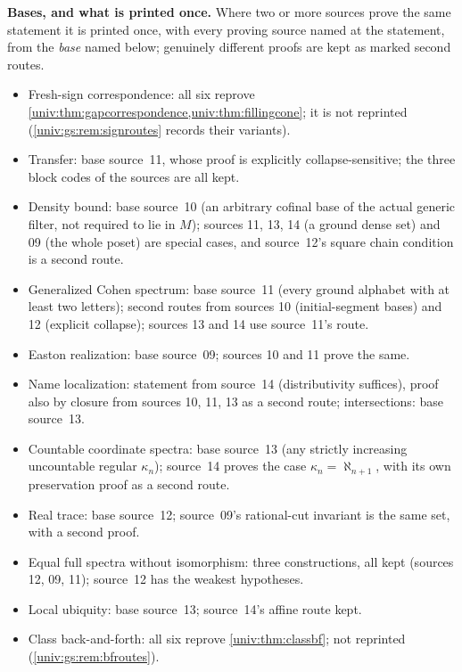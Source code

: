 \documentclass[11pt,letterpaper]{article}
\numberwithin{equation}{section}
\theoremstyle{definition}
\theoremstyle{remark}
\begin{document}
\textbf{Bases, and what is printed once.} Where two or more sources prove the
same statement it is printed once, with every proving source named at the
statement, from the \emph{base} named below; genuinely different proofs are
kept as marked second routes.
\begin{itemize}
\item Fresh-sign correspondence: all six reprove
\cref{univ:thm:gapcorrespondence,univ:thm:fillingcone}; it is not reprinted
(\cref{univ:gs:rem:signroutes} records their variants).
\item Transfer: base source~11, whose proof is explicitly collapse-sensitive;
the three block codes of the sources are all kept.
\item Density bound: base source~10 (an arbitrary cofinal base of the actual
generic filter, not required to lie in $M$); sources 11, 13, 14 (a ground dense
set) and 09 (the whole poset) are special cases, and source~12's square chain
condition is a second route.
\item Generalized Cohen spectrum: base source~11 (every ground alphabet with at
least two letters); second routes from sources 10 (initial-segment bases) and
12 (explicit collapse); sources 13 and 14 use source~11's route.
\item Easton realization: base source~09; sources 10 and 11 prove the same.
\item Name localization: statement from source~14 (distributivity suffices),
proof also by closure from sources 10, 11, 13 as a second route;
intersections: base source~13.
\item Countable coordinate spectra: base source~13 (any strictly increasing
uncountable regular $\kappa_n$); source~14 proves the case
$\kappa_n=\aleph_{n+1}$, with its own preservation proof as a second route.
\item Real trace: base source~12; source~09's rational-cut invariant is the same
set, with a second proof.
\item Equal full spectra without isomorphism: three constructions, all kept
(sources 12, 09, 11); source~12 has the weakest hypotheses.
\item Local ubiquity: base source~13; source~14's affine route kept.
\item Class back-and-forth: all six reprove \cref{univ:thm:classbf}; not
reprinted (\cref{univ:gs:rem:bfroutes}).
\end{itemize}
\end{document}
